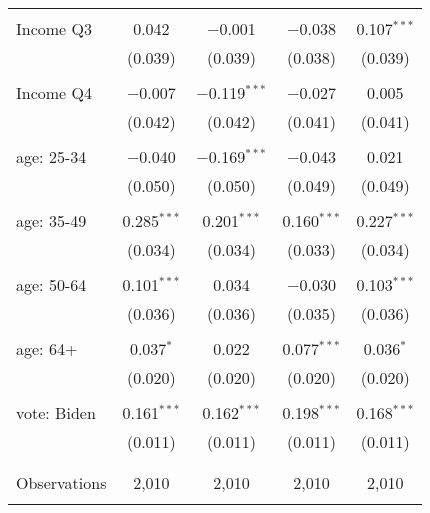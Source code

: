 \begin{tabular}{@{\extracolsep{5pt}}lcccc}
  & & & & \\ 
 Income Q3 & 0.042 & $-$0.001 & $-$0.038 & 0.107$^{***}$ \\ 
  & (0.039) & (0.039) & (0.038) & (0.039) \\ 
  & & & & \\ 
 Income Q4 & $-$0.007 & $-$0.119$^{***}$ & $-$0.027 & 0.005 \\ 
  & (0.042) & (0.042) & (0.041) & (0.041) \\ 
  & & & & \\ 
 age: 25-34 & $-$0.040 & $-$0.169$^{***}$ & $-$0.043 & 0.021 \\ 
  & (0.050) & (0.050) & (0.049) & (0.049) \\ 
  & & & & \\ 
 age: 35-49 & 0.285$^{***}$ & 0.201$^{***}$ & 0.160$^{***}$ & 0.227$^{***}$ \\ 
  & (0.034) & (0.034) & (0.033) & (0.034) \\ 
  & & & & \\ 
 age: 50-64 & 0.101$^{***}$ & 0.034 & $-$0.030 & 0.103$^{***}$ \\ 
  & (0.036) & (0.036) & (0.035) & (0.036) \\ 
  & & & & \\ 
 age: 64+ & 0.037$^{*}$ & 0.022 & 0.077$^{***}$ & 0.036$^{*}$ \\ 
  & (0.020) & (0.020) & (0.020) & (0.020) \\ 
  & & & & \\ 
 vote: Biden & 0.161$^{***}$ & 0.162$^{***}$ & 0.198$^{***}$ & 0.168$^{***}$ \\ 
  & (0.011) & (0.011) & (0.011) & (0.011) \\ 
  & & & & \\ 
\hline \\[-1.8ex] 

Observations & 2,010 & 2,010 & 2,010 & 2,010 \\ 
\hline 
\hline \\[-1.8ex] 
\end{tabular} 